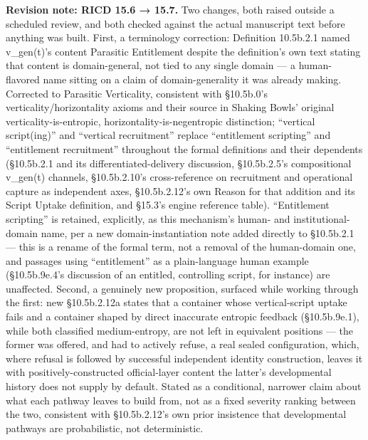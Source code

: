 \documentclass[
]{article}
\begin{document}
\textbf{Revision note: RICD 15.6 → 15.7.} Two changes, both raised
outside a scheduled review, and both checked
against the actual manuscript text before anything was built. First, a
terminology correction: Definition 10.5b.2.1 named v\_gen(t)'s content
Parasitic Entitlement despite the definition's own text stating that
content is domain-general, not tied to any single domain --- a
human-flavored name sitting on a claim of domain-generality it was
already making. Corrected to Parasitic Verticality, consistent with
§10.5b.0's verticality/horizontality axioms and their source in Shaking
Bowls' original verticality-is-entropic, horizontality-is-negentropic
distinction; ``vertical script(ing)'' and ``vertical recruitment''
replace ``entitlement scripting'' and ``entitlement recruitment''
throughout the formal definitions and their dependents (§10.5b.2.1 and
its differentiated-delivery discussion, §10.5b.2.5's compositional
v\_gen(t) channels, §10.5b.2.10's cross-reference on recruitment and
operational capture as independent axes, §10.5b.2.12's own Reason for
that addition and its Script Uptake definition, and §15.3's engine
reference table). ``Entitlement scripting'' is retained, explicitly, as
this mechanism's human- and institutional-domain name, per a new
domain-instantiation note added directly to §10.5b.2.1 --- this is a
rename of the formal term, not a removal of the human-domain one, and
passages using ``entitlement'' as a plain-language human example
(§10.5b.9e.4's discussion of an entitled, controlling script, for
instance) are unaffected. Second, a
genuinely new proposition, surfaced while working through the first: new
§10.5b.2.12a states that a container whose vertical-script uptake fails
and a container shaped by direct inaccurate entropic feedback
(§10.5b.9e.1), while both classified medium-entropy, are not left in
equivalent positions --- the former was offered, and had to actively
refuse, a real sealed configuration, which, where refusal is followed by
successful independent identity construction, leaves it with
positively-constructed official-layer content the latter's developmental
history does not supply by default. Stated as a conditional, narrower
claim about what each pathway leaves to build from, not as a fixed
severity ranking between the two, consistent with §10.5b.2.12's own
prior insistence that developmental pathways are probabilistic, not
deterministic.
\end{document}
